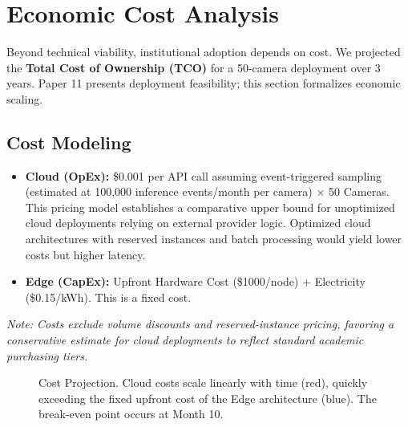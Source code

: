 \documentclass[conference]{IEEEtran}
\begin{document}
\section{Economic Cost Analysis}
Beyond technical viability, institutional adoption depends on cost. We projected the \textbf{Total Cost of Ownership (TCO)} for a 50-camera deployment over 3 years. Paper 11 presents deployment feasibility; this section formalizes economic scaling.

\subsection{Cost Modeling}
\begin{itemize}
    \item \textbf{Cloud (OpEx):} \$0.001 per API call assuming event-triggered sampling (estimated at 100,000 inference events/month per camera) $\times$ 50 Cameras. This pricing model establishes a comparative upper bound for unoptimized cloud deployments relying on external provider logic. Optimized cloud architectures with reserved instances and batch processing would yield lower costs but higher latency.
    \item \textbf{Edge (CapEx):} Upfront Hardware Cost (\$1000/node) + Electricity (\$0.15/kWh). This is a fixed cost.
\end{itemize}

\textit{Note: Costs exclude volume discounts and reserved-instance pricing, favoring a conservative estimate for cloud deployments to reflect standard academic purchasing tiers.}

\begin{figure}[htbp]
\centering
{}
\caption{Cost Projection. Cloud costs scale linearly with time (red), quickly exceeding the fixed upfront cost of the Edge architecture (blue). The break-even point occurs at Month 10.}
\label{fig:cost}
\end{figure}
\end{document}
